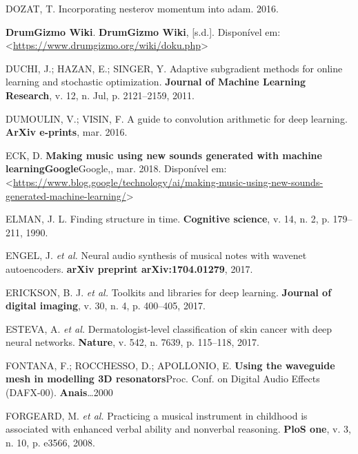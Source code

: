\documentclass[]{article}
\begin{document}
\leavevmode\hypertarget{ref-dozat2016incorporating}{}%
DOZAT, T. Incorporating nesterov momentum into adam. 2016.

\leavevmode\hypertarget{ref-drumgizmo}{}%
\textbf{DrumGizmo Wiki}. \textbf{DrumGizmo Wiki}, {[}s.d.{]}. Disponível
em:
\textless{}\url{https://www.drumgizmo.org/wiki/doku.php}\textgreater{}

\leavevmode\hypertarget{ref-duchi2011adaptive}{}%
DUCHI, J.; HAZAN, E.; SINGER, Y. Adaptive subgradient methods for online
learning and stochastic optimization. \textbf{Journal of Machine
Learning Research}, v. 12, n. Jul, p. 2121--2159, 2011.

\leavevmode\hypertarget{ref-dumoulin2016guide}{}%
DUMOULIN, V.; VISIN, F. A guide to convolution arithmetic for deep
learning. \textbf{ArXiv e-prints}, mar. 2016.

\leavevmode\hypertarget{ref-eck_2018}{}%
ECK, D. \textbf{Making music using new sounds generated with machine
learning}\textbf{Google}Google,, mar. 2018. Disponível em:
\textless{}\url{https://www.blog.google/technology/ai/making-music-using-new-sounds-generated-machine-learning/}\textgreater{}

\leavevmode\hypertarget{ref-elman1990finding}{}%
ELMAN, J. L. Finding structure in time. \textbf{Cognitive science}, v.
14, n. 2, p. 179--211, 1990.

\leavevmode\hypertarget{ref-engel2017neural}{}%
ENGEL, J. \emph{et al.} Neural audio synthesis of musical notes with
wavenet autoencoders. \textbf{arXiv preprint arXiv:1704.01279}, 2017.

\leavevmode\hypertarget{ref-erickson2017toolkits}{}%
ERICKSON, B. J. \emph{et al.} Toolkits and libraries for deep learning.
\textbf{Journal of digital imaging}, v. 30, n. 4, p. 400--405, 2017.

\leavevmode\hypertarget{ref-esteva2017dermatologist}{}%
ESTEVA, A. \emph{et al.} Dermatologist-level classification of skin
cancer with deep neural networks. \textbf{Nature}, v. 542, n. 7639, p.
115--118, 2017.

\leavevmode\hypertarget{ref-fontana2000using}{}%
FONTANA, F.; ROCCHESSO, D.; APOLLONIO, E. \textbf{Using the waveguide
mesh in modelling 3D resonators}Proc. Conf. on Digital Audio Effects
(DAFX-00). \textbf{Anais}\ldots{}2000

\leavevmode\hypertarget{ref-forgeard2008practicing}{}%
FORGEARD, M. \emph{et al.} Practicing a musical instrument in childhood
is associated with enhanced verbal ability and nonverbal reasoning.
\textbf{PloS one}, v. 3, n. 10, p. e3566, 2008.
\end{document}
